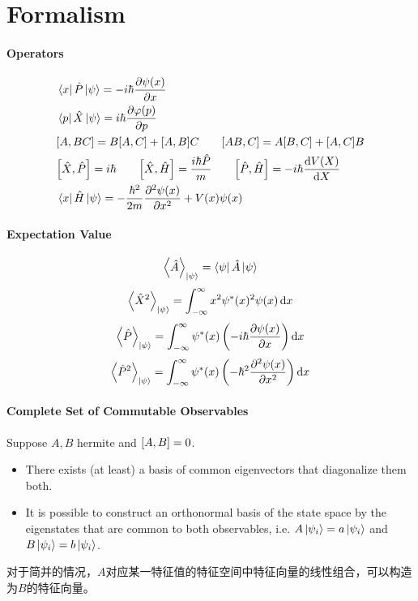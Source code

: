 \documentclass[a4paper,10pt]{article}
\begin{document}
\section{Formalism}
\paragraph{Operators}
\begin{align*}
     & \bra{x}\hat{P}\ket{\psi}=-i\hbar\pdv{\psi(x)}{x}                                                                                   \\
     & \bra{p}\hat{X}\ket{\psi}=i\hbar\pdv{\varphi(p)}{p}                                                                                 \\
     & \comm{A}{BC}=B\comm{A}{C}+\comm{A}{B}C\qq{}\comm{AB}{C}=A\comm{B}{C}+\comm{A}{C}B                                                  \\
     & \comm{\hat{X}}{\hat{P}}=i\hbar\qq{}\comm{\hat{X}}{\hat{H}}=\frac{i\hbar\hat{P}}{m}\qq{}\comm{\hat{P}}{\hat{H}}=-i\hbar\dv{V(X)}{X} \\
     & \bra{x}\hat{H}\ket{\psi}=-\frac{\hbar^2}{2m}\pdv[2]{\psi(x)}{x}+V(x)\psi(x)
\end{align*}
\paragraph{Expectation Value}
$$\expval{\hat{A}}_{\ket{\psi}}=\bra{\psi}\hat{A}\ket{\psi}$$
$$\expval{\hat{X}^2}_{\ket{\psi}}=\int_{-\infty}^{\infty}x^2\psi^\ast(x)^2\psi(x)\dd{x}$$
$$\expval{\hat{P}}_{\ket{\psi}}=\int_{-\infty}^{\infty}\psi^\ast(x)\left(-i\hbar\pdv{\psi(x)}{x}\right)\dd{x}$$
$$\expval{\hat{P}^2}_{\ket{\psi}}=\int_{-\infty}^{\infty}\psi^\ast(x)\left(-\hbar^2\pdv[2]{\psi(x)}{x}\right)\dd{x}$$
\paragraph{Complete Set of Commutable Observables}
Suppose $A,B$ hermite and $\comm{A}{B}=0$.
\begin{itemize}
    \item There exists (at least) a basis of common eigenvectors that diagonalize them both.
    \item It is possible to construct an orthonormal basis of the state space by the eigenstates that are common to both observables, i.e. $A\ket{\psi_i}=a\ket{\psi_i}$ and $B\ket{\psi_i}=b\ket{\psi_i}$.
\end{itemize}
对于简并的情况，$A$对应某一特征值的特征空间中特征向量的线性组合，可以构造为$B$的特征向量。
\end{document}
